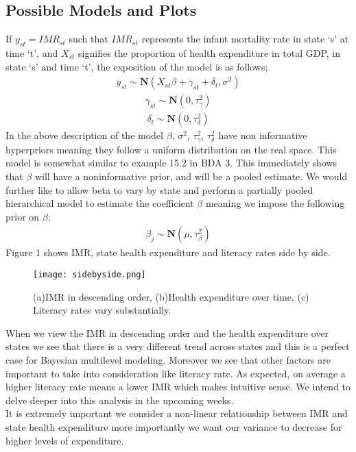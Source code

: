\documentclass{article}
\begin{document}
\subsection{Possible Models and Plots}
If $y_{st} = IMR_{st}$ such that $IMR_{st}$ represents the infant mortality rate in state `s' at time `t', and $X_{st}$ signifies the proportion of health expenditure in total GDP, in state `s' and time `t', the exposition of the model is as follows;
\begin{align*}
y_{st} \sim \textbf{N}(X_{st}\beta + \gamma_{st} + \delta_t , \sigma ^2)
\end{align*}
\begin{align*}
\gamma_{st} \sim \textbf{N}(0, \tau_ {\gamma}^2)
\end{align*}
\begin{align*}
\delta_t \sim \textbf{N}(0, \tau_{\delta}^2)
\end{align*}
In the above description of the model $\beta$, $\sigma ^2$, $\tau_ {\gamma}^2$, $\tau_{\delta}^2$ have non informative hyperpriors meaning they follow a uniform distribution on the real space. This model is somewhat similar to example 15.2 in BDA 3. This immediately shows that $\beta$ will have a noninformative prior, and will be a pooled estimate. We would further like to allow beta to vary by state and perform a partially pooled hierarchical model to estimate the coefficient $\beta$ meaning we impose the following prior on $\beta$;
\begin{align*}
\beta_j \sim \textbf{N}(\mu, \tau_\beta ^2)
\end{align*}
Figure 1 shows IMR, state health expenditure and literacy rates side by side.
 \begin{figure}[H]
\centering
\texttt{[image: sidebyside.png]}
\caption{(a)IMR in descending order, (b)Health expenditure over time, (c) Literacy rates vary substantially.}
\label{deltat}
\end{figure}
When we view the IMR in descending order and the health expenditure over states we see that there is a very different trend across states and this is a perfect case for Bayesian multilevel modeling. Moreover we see that other factors are important to take into consideration like literacy rate. As expected, on average a higher literacy rate means a lower IMR which makes intuitive sense. We intend to delve deeper into this analysis in the upcoming weeks.\\
It is extremely important we consider a non-linear relationship between IMR and state health expenditure more importantly we want our variance to decrease for higher levels of expenditure.
\end{document}

